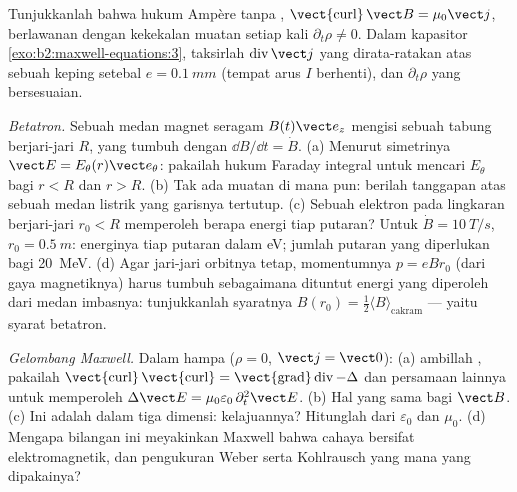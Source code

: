 \begin{exercise}[$\star\star$]\label{exo:b2:maxwell-equations:9}
Tunjukkanlah bahwa hukum Ampère tanpa , $\operatorname{\vect{curl}}
\vect B = \mu_0\vect j$, berlawanan dengan kekekalan muatan setiap kali $\partial_t\rho
\ne 0$. Dalam kapasitor \cref{exo:b2:maxwell-equations:3}, taksirlah
$\operatorname{div}\vect j$ yang dirata-ratakan atas sebuah keping setebal $e = \qty{0.1}{mm}$
(tempat arus $I$ berhenti), dan $\partial_t\rho$ yang bersesuaian.
\end{exercise}

\begin{exercise}[$\star\star\star$]\label{exo:b2:maxwell-equations:10}
\emph{Betatron.} Sebuah medan magnet seragam $B(t)\vect e_z$ mengisi
sebuah tabung berjari-jari $R$, yang tumbuh dengan $\dd B/\dd t = \dot B$. (a) Menurut simetrinya
$\vect E = E_\theta(r)\vect e_\theta$: pakailah hukum Faraday integral untuk mencari $E_\theta$
bagi $r < R$ dan $r > R$. (b) Tak ada muatan di mana pun: berilah tanggapan atas sebuah
medan listrik yang garisnya tertutup. (c) Sebuah elektron pada lingkaran berjari-jari
$r_0 < R$ memperoleh berapa energi tiap putaran? Untuk $\dot B = \qty{10}{T/s}$,
$r_0 = \qty{0.5}{m}$: energinya tiap putaran dalam eV; jumlah putaran yang diperlukan bagi \qty{20}{MeV}.
(d) Agar jari-jari orbitnya tetap, momentumnya $p = eBr_0$ (dari
gaya magnetiknya) harus tumbuh sebagaimana dituntut energi yang diperoleh dari medan imbasnya:
tunjukkanlah syaratnya $B(r_0) = \tfrac12\langle B\rangle_{\text{cakram}}$
--- yaitu syarat betatron.
\end{exercise}

\begin{exercise}[$\star\star\star$]\label{exo:b2:maxwell-equations:11}
\emph{Gelombang Maxwell.} Dalam hampa ($\rho = 0$, $\vect j = \vect 0$): (a) ambillah
 , pakailah $\operatorname{\vect{curl}}
\operatorname{\vect{curl}} = \operatorname{\vect{grad}}\operatorname{div} - \Delta$ dan persamaan
lainnya untuk memperoleh $\Delta\vect E = \mu_0\varepsilon_0\,\partial_t^2\vect E$. (b) Hal yang sama bagi
$\vect B$. (c) Ini adalah  dalam tiga dimensi: kelajuannya?
Hitunglah dari $\varepsilon_0$ dan $\mu_0$. (d) Mengapa bilangan ini meyakinkan
Maxwell bahwa cahaya bersifat elektromagnetik, dan pengukuran
Weber serta Kohlrausch yang mana yang dipakainya?
\end{exercise}

